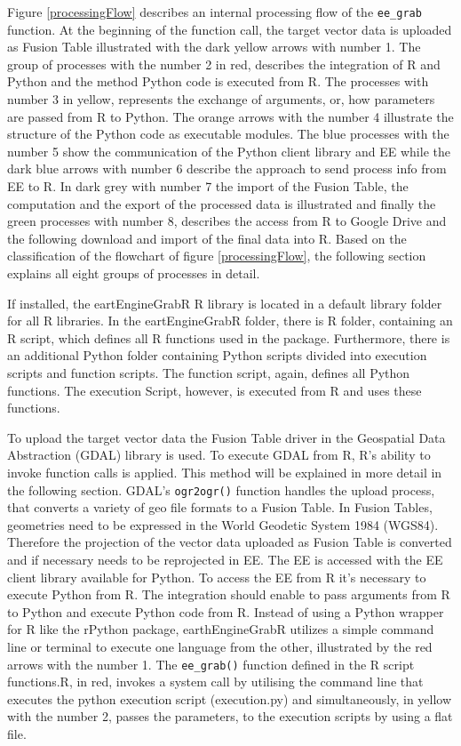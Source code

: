 Figure \ref{processingFlow} describes an internal processing flow of the \texttt{ee\_grab} function.
At the beginning of the function call, the target vector data is uploaded as Fusion Table illustrated with the dark yellow arrows with number 1. 
The group of processes with the number 2 in red, describes the integration of R and Python and the method Python code is executed from R. The processes with number 3 in yellow, represents the exchange of arguments, or,  how parameters are passed from R to Python. The orange arrows with the number 4 illustrate the structure of the Python code as executable modules. The blue processes with the number 5 show the communication of the Python client library and EE while the dark blue arrows with number 6 describe the approach to send process info from EE to R. In dark grey with number 7 the import of the Fusion Table, the computation and the export of the processed data is illustrated and finally the green processes with number 8, describes the access from R to Google Drive and the following download and import of the final data into R.
Based on the classification of the flowchart of figure \ref{processingFlow}, the following section explains all eight groups of processes in detail.

If installed, the eartEngineGrabR R library is located in a default library folder for all R libraries. In the eartEngineGrabR folder, there is R folder, containing an R script, which defines all R functions used in the package. Furthermore, there is an additional Python folder containing Python scripts divided into execution scripts and function scripts. The function script, again, defines all Python functions. The execution Script, however, is executed from R and uses these functions.

To upload the target vector data the Fusion Table driver in the Geospatial Data Abstraction (GDAL) library is used. To execute GDAL from R, R's ability to invoke function calls is applied. This method will be explained in more detail in the following section. GDAL's \texttt{ogr2ogr()}  function handles the upload process, that converts a variety of geo file formats to a Fusion Table. In Fusion Tables, geometries need to be expressed in the World Geodetic System 1984 (WGS84). Therefore the projection of the vector data uploaded as Fusion Table is converted and if necessary needs to be reprojected in EE.
The EE is accessed with the EE client library available for Python. To access the EE from R it's necessary to execute Python from R. The integration should enable to pass arguments from R to Python and execute Python code from R. Instead of using a Python wrapper for R like the rPython package, earthEngineGrabR utilizes a simple command line or terminal to execute one language from the other, illustrated by the red arrows with the number 1. The \texttt{ee\_grab()} function defined in the R script functions.R, in red, invokes a system call by utilising the command line that executes the python execution script (execution.py) and simultaneously, in yellow with the number 2, passes the parameters, to the execution scripts by using a flat file. 

